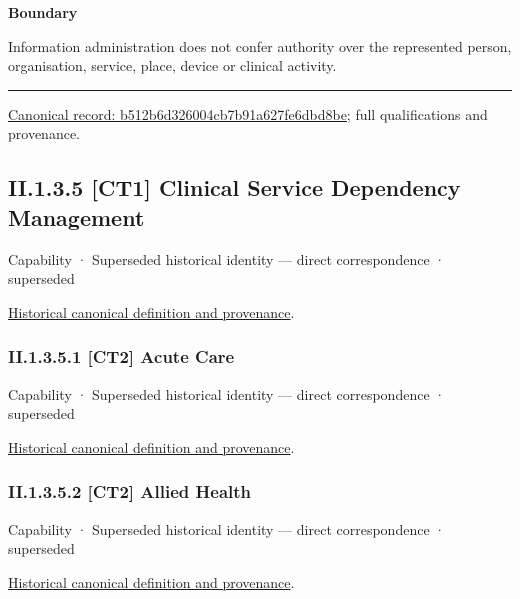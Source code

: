 \textbf{Boundary}



Information administration does not confer authority over the represented person, organisation, service, place, device or clinical activity.



\medskip\hrule\medskip

{\footnotesize \href{../../../../continuum/strategy/capability/b512b6d326004cb7b91a627fe6dbd8be.md}{Canonical record: b512b6d326004cb7b91a627fe6dbd8be}; full qualifications and provenance.}\par
\subsection*{II.1.3.5 [CT1] Clinical Service Dependency Management}
\label{navigation:II.1.3.5}

\label{element:984ee17123eb4f92b3e55e55d24459b8}
{\small Capability · Superseded historical identity — direct correspondence · superseded}\par
\href{../../../../continuum/strategy/capability/984ee17123eb4f92b3e55e55d24459b8.md}{Historical canonical definition and provenance}.\par
\subsubsection*{II.1.3.5.1 [CT2] Acute Care}
\label{navigation:II.1.3.5.1}

\label{element:7b591957f7424424abc80f699e9f1960}
{\small Capability · Superseded historical identity — direct correspondence · superseded}\par
\href{../../../../continuum/strategy/capability/7b591957f7424424abc80f699e9f1960.md}{Historical canonical definition and provenance}.\par
\subsubsection*{II.1.3.5.2 [CT2] Allied Health}
\label{navigation:II.1.3.5.2}

\label{element:6cd45c27d0c344b9807174dbd812d572}
{\small Capability · Superseded historical identity — direct correspondence · superseded}\par
\href{../../../../continuum/strategy/capability/6cd45c27d0c344b9807174dbd812d572.md}{Historical canonical definition and provenance}.\par
